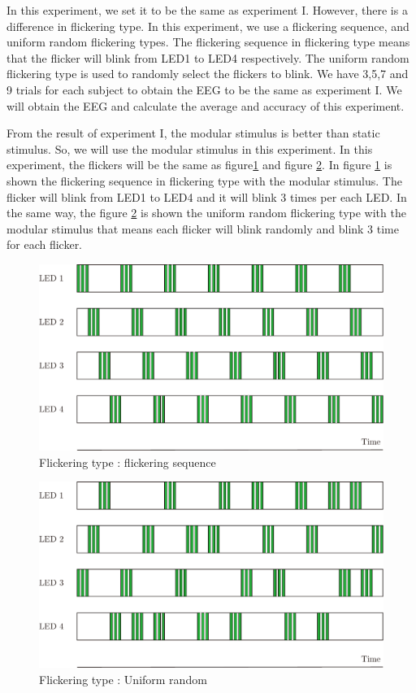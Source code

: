 In this experiment, we set it to be the same as experiment I. However, there is a difference in flickering type. In this experiment, we use a flickering sequence, and uniform random flickering types. The flickering sequence in flickering type means that the flicker will blink from LED1 to LED4 respectively. The uniform random flickering type is used to randomly select the flickers to blink. We have 3,5,7 and 9 trials for each subject to obtain the EEG to be the same as experiment I. We will obtain the EEG and calculate the average and accuracy of this experiment.

From the result of experiment I, the modular stimulus is better than static stimulus. So, we will use the modular stimulus in this experiment. In this experiment, the flickers will be the same as figure\ref{fig:mod_reg} and figure \ref{fig:mod_uni}.
In figure \ref{fig:mod_reg} is shown the flickering sequence in flickering type with the modular stimulus. The flicker will blink from LED1 to LED4 and it will blink 3 times per each LED. In the same way, the figure \ref{fig:mod_uni} is shown the uniform random flickering type with the modular stimulus that means each flicker will blink randomly and blink 3 time for each flicker.

\begin{figure}[ht]
	\centering
	\includegraphics[scale = 0.65]{chapter7/mod_nor.pdf}
	\caption{Flickering type : flickering sequence}
    \label{fig:mod_reg}
\end{figure}

\begin{figure}[ht]
	\centering
	\includegraphics[scale = 0.65]{chapter7/mod_uni.pdf}
	\caption{Flickering type : Uniform random}
    \label{fig:mod_uni}
\end{figure}


